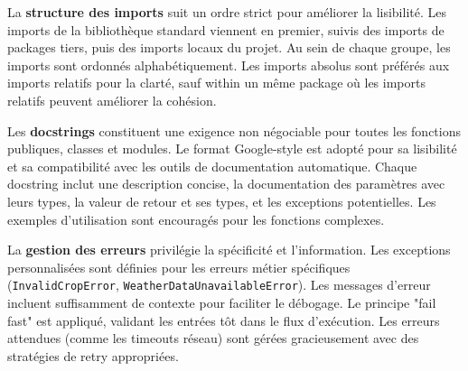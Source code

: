 La \textbf{structure des imports} suit un ordre strict pour améliorer la lisibilité. Les imports de la bibliothèque standard viennent en premier, suivis des imports de packages tiers, puis des imports locaux du projet. Au sein de chaque groupe, les imports sont ordonnés alphabétiquement. Les imports absolus sont préférés aux imports relatifs pour la clarté, sauf within un même package où les imports relatifs peuvent améliorer la cohésion.

Les \textbf{docstrings} constituent une exigence non négociable pour toutes les fonctions publiques, classes et modules. Le format Google-style est adopté pour sa lisibilité et sa compatibilité avec les outils de documentation automatique. Chaque docstring inclut une description concise, la documentation des paramètres avec leurs types, la valeur de retour et ses types, et les exceptions potentielles. Les exemples d'utilisation sont encouragés pour les fonctions complexes.





La \textbf{gestion des erreurs} privilégie la spécificité et l'information. Les exceptions personnalisées sont définies pour les erreurs métier spécifiques (\texttt{InvalidCropError}, \texttt{WeatherDataUnavailableError}). Les messages d'erreur incluent suffisamment de contexte pour faciliter le débogage. Le principe "fail fast" est appliqué, validant les entrées tôt dans le flux d'exécution. Les erreurs attendues (comme les timeouts réseau) sont gérées gracieusement avec des stratégies de retry appropriées.


